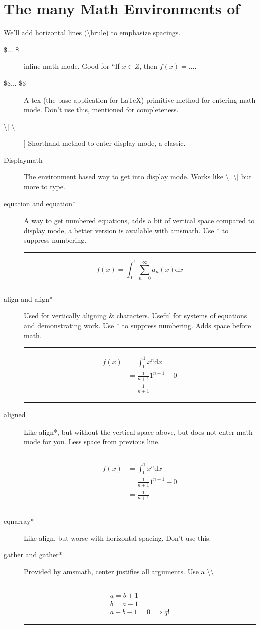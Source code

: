 \documentclass[11pt]{article}
\begin{document}
\section{The many Math Environments of \LaTeXe}
We'll add horizontal lines (\textbackslash hrule) to emphasize spacings. 
\begin{description}
	\item [\$... \$] inline math mode. Good for ``If $x \in Z$, then  $f(x) = \ldots$. 
	\item [\$\$... \$\$] A tex (the base application for \LaTeX) primitive method for entering math mode. Don't use this, mentioned for completeness. 
	\item [\textbackslash [ \textbackslash]] Shorthand method to enter display mode, a classic.
	\item [Displaymath] The environment based way to get into display mode. Works like \textbackslash [ \textbackslash] but more to type.
	\item[equation and equation*] A way to get numbered equations, adds a bit of vertical space compared to display mode, a better version is available with amsmath. Use * to suppress numbering. \hrule
	\begin{equation}
	f(x) = \int_0^1 \sum_{n=0}^\infty a_n(x) \mathrm{d} x
	\end{equation}\hrule
	\item [align and align*] Used for vertically aligning \& characters. Useful for systems of equations and demonstrating work. Use * to suppress numbering. Adds space before math.
	\hrule
	\begin{align}
	f(x) & = \int_0^1 x^n \mathrm{d} x \\
	& = \frac{1}{n+1} 1^{n+1} - 0 \\
	& = \frac{1}{n+1}
	\end{align}
	\hrule
	\item[aligned] Like align*, but without the vertical space above, but does not enter math mode for you. Less space from previous line.\
	\hrule
	\[
	\begin{aligned}
	f(x) & = \int_0^1 x^n \mathrm{d} x \\
		 & = \frac{1}{n+1} 1^{n+1} - 0 \\
   		 & = \frac{1}{n+1}
	\end{aligned}
	\]
	\hrule
	\item[eqnarray*] Like align, but worse with horizontal spacing. Don't use this. 
	\item[gather and gather*] Provided by amsmath, center justifies all arguments. Use a \textbackslash \textbackslash
	\hrule
	\begin{gather}
	a = b+1 \\
	b = a - 1 \\
	a-b-1 = 0 \implies q!
	\end{gather}
	\hrule
\end{description}
\end{document}
